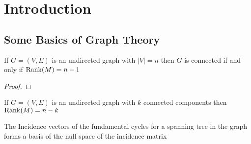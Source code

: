 \chapter{Introduction}
\section{Some Basics of Graph Theory}
\begin{Theorem}{}{}
	If $G=(V,E)$ is an undirected graph with $|V|=n$ then $G$ is connected if and only if $\operatorname{Rank}(M)=n-1$
\end{Theorem}
\begin{proof}
\end{proof}
\begin{corolary}{}{}
	If $G=(V,E)$ is an undirected graph with $k$ connected components then $\operatorname{Rank}(M)=n-k$
\end{corolary}
\begin{Theorem}{}{}
	The Incidence vectors of the  fundamental cycles for a spanning tree in the graph forms a basis of the null space of the incidence matrix
\end{Theorem}